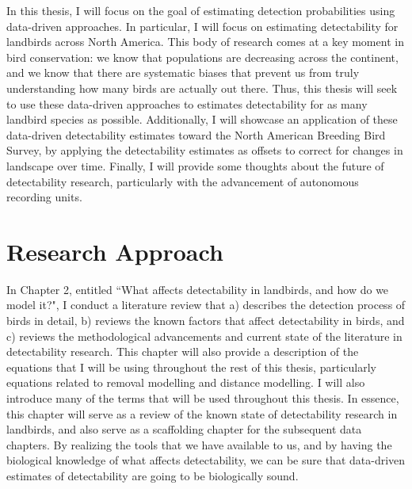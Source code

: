 \par In this thesis, I will focus on the goal of estimating detection probabilities using data-driven approaches.
In particular, I will focus on estimating detectability for landbirds across North America.
This body of research comes at a key moment in bird conservation: we know that populations are decreasing across the continent, and we know that there are systematic biases that prevent us from truly understanding how many birds are actually out there.
Thus, this thesis will seek to use these data-driven approaches to estimates detectability for as many landbird species as possible.
Additionally, I will showcase an application of these data-driven detectability estimates toward the North American Breeding Bird Survey, by applying the detectability estimates as offsets to correct for changes in landscape over time.
Finally, I will provide some thoughts about the future of detectability research, particularly with the advancement of autonomous recording units.

\section{Research Approach}

\par In Chapter 2, entitled ``What affects detectability in landbirds, and how do we model it?", I conduct a literature review that a) describes the detection process of birds in detail, b) reviews the known factors that affect detectability in birds, and c) reviews the methodological advancements and current state of the literature in detectability research.
This chapter will also provide a description of the equations that I will be using throughout the rest of this thesis, particularly equations related to removal modelling and distance modelling.
I will also introduce many of the terms that will be used throughout this thesis.
In essence, this chapter will serve as a review of the known state of detectability research in landbirds, and also serve as a scaffolding chapter for the subsequent data chapters.
By realizing the tools that we have available to us, and by having the biological knowledge of what affects detectability, we can be sure that data-driven estimates of detectability are going to be biologically sound.


